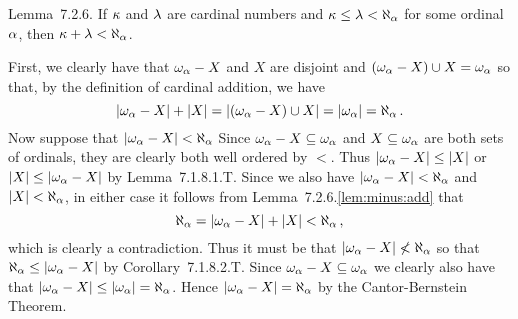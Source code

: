 \def\ex{7.2.6}
\setcounter{itm}{0}
\question{\ex}
\begin{solution}
    \begin{statement}{Lemma~\ex.}
        If $\kappa$ and $\lambda$ are cardinal numbers and $\kappa \leq \lambda < \aleph_\alpha$ for some ordinal $\alpha$, then $\kappa + \lambda < \aleph_\alpha$.
    \end{statement}

    \mainprob

    First, we clearly have that $\omega_\alpha - X$ and $X$ are disjoint and $(\omega_\alpha - X) \cup X = \omega_\alpha$ so that, by the definition of cardinal addition, we have
    $$
    \left| \omega_\alpha - X \right| + \left| X \right| = \left| (\omega_\alpha - X) \cup X \right| = \left| \omega_\alpha \right| = \aleph_\alpha \,.
    $$
    Now suppose that $\left| \omega_\alpha - X \right| < \aleph_\alpha$
    Since $\omega_\alpha - X \subseteq \omega_\alpha$ and $X \subseteq \omega_\alpha$ are both sets of ordinals, they are clearly both well ordered by $<$.
    Thus $\left| \omega_\alpha - X \right| \leq \left| X \right|$ or $\left| X \right| \leq \left| \omega_\alpha - X \right|$ by Lemma~7.1.8.1.T.
    Since we also have $\left| \omega_\alpha - X \right| < \aleph_\alpha$ and $\left| X \right| < \aleph_\alpha$, in either case it follows from Lemma~\ex.\ref{lem:minus:add} that
    $$
    \aleph_\alpha = \left| \omega_\alpha - X \right| + \left| X \right| < \aleph_\alpha \,,
    $$
    which is clearly a contradiction.
    Thus it must be that $\left| \omega_\alpha - X \right| \nless \aleph_\alpha$ so that $\aleph_\alpha \leq \left| \omega_\alpha - X \right|$ by Corollary~7.1.8.2.T.
    Since $\omega_\alpha - X \subseteq \omega_\alpha$ we clearly also have that $\left| \omega_\alpha - X \right| \leq \left| \omega_\alpha \right| = \aleph_\alpha$.
    Hence $\left| \omega_\alpha - X \right| = \aleph_\alpha$ by the Cantor-Bernstein Theorem. \qedsymbol
\end{solution}
